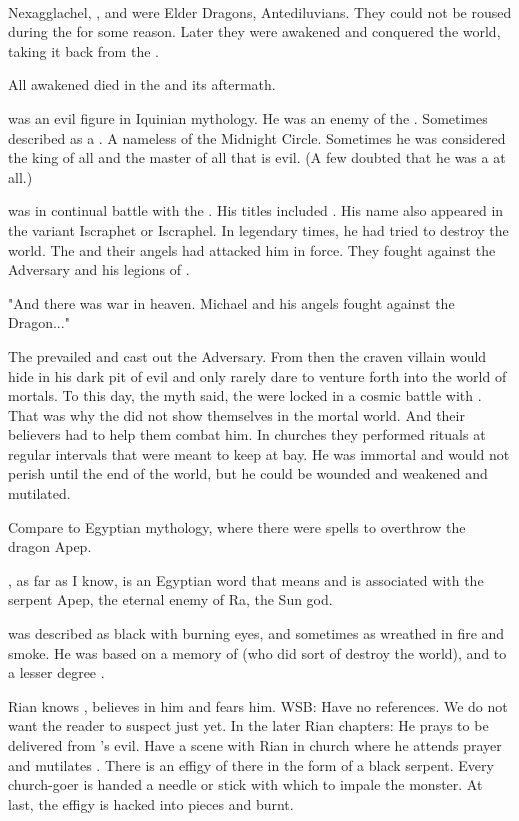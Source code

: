 \\Nexagglachel, \Ishnaruchaefir, and \Secherdamon were Elder Dragons, Antediluvians. 
They could not be roused during the \firstbanewar for some reason. 
Later they were awakened and conquered the world, taking it back from the \aryothim. 


All awakened \dragons died in the \firstbanewar and its aftermath.


\Isphet was an evil figure in Iquinian mythology. 
He was an enemy of the \sephiroth. 
Sometimes described as a \qliphah. 
A nameless \qliphah of the Midnight Circle. 
Sometimes he was considered the king of all \qliphoth and the master of all that is evil. 
(A few doubted that he was a \qliphah at all.)

\Isphet was in continual battle with the \sephiroth.
His titles included .
His name also appeared in the variant Iscraphet or Iscraphel. 
In legendary times, he had tried to destroy the world. 
The \sephiroth and their angels had attacked him in force. 
They fought against the Adversary and his legions of \qliphoth. 

"And there was war in heaven. Michael and his angels fought against the Dragon..."

The \sephiroth prevailed and cast out the Adversary. 
From then the craven villain would hide in his dark pit of evil and only rarely dare to venture forth into the world of mortals. 
To this day, the myth said, the \sephiroth were locked in a cosmic battle with \Isphet. 
That was why the \sephiroth did not show themselves in the mortal world. 
And their believers had to help them combat him. 
In churches they performed rituals at regular intervals that were meant to keep \Isphet at bay.
He was immortal and would not perish until the end of the world, but he could be wounded and weakened and mutilated.

Compare to Egyptian mythology, where there were spells to overthrow the dragon Apep. 

, as far as I know, is an Egyptian word that means  and is associated with the serpent Apep, the eternal enemy of Ra, the Sun god. 

\Isphet was described as black with burning eyes, and sometimes as wreathed in fire and smoke. 
He was based on a memory of \Ishnaruchaefir (who did sort of destroy the world), and to a lesser degree \Secherdamon.

Rian knows \Isphet, believes in him and fears him. 
WSB: Have no \Isphet references. We do not want the reader to suspect just yet. 
In the later Rian chapters: He prays to be delivered from \Isphet's evil. 
Have a scene with Rian in church where he attends prayer and mutilates \Isphet. 
There is an effigy of \Isphet there in the form of a black serpent. 
Every church-goer is handed a needle or stick with which to impale the monster. 
At last, the effigy is hacked into pieces and burnt. 

